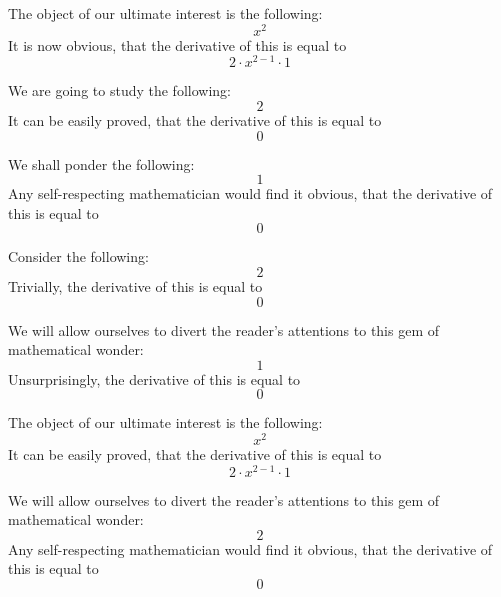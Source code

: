 \documentclass{article}
\begin{document}
The object of our ultimate interest is the following:
\begin{equation}
x ^{2 } 
\end{equation}
It is now obvious, that the derivative of this is equal to
\begin{equation}
2 \cdot x ^{2 - 1 } \cdot 1 
\end{equation}

We are going to study the following:
\begin{equation}
2 
\end{equation}
It can be easily proved, that the derivative of this is equal to
\begin{equation}
0 
\end{equation}

We shall ponder the following:
\begin{equation}
1 
\end{equation}
Any self-respecting mathematician would find it obvious, that the derivative of this is equal to
\begin{equation}
0 
\end{equation}

Consider the following:
\begin{equation}
2 
\end{equation}
Trivially, the derivative of this is equal to
\begin{equation}
0 
\end{equation}

We will allow ourselves to divert the reader's attentions to this gem of mathematical wonder:
\begin{equation}
1 
\end{equation}
Unsurprisingly, the derivative of this is equal to
\begin{equation}
0 
\end{equation}

The object of our ultimate interest is the following:
\begin{equation}
x ^{2 } 
\end{equation}
It can be easily proved, that the derivative of this is equal to
\begin{equation}
2 \cdot x ^{2 - 1 } \cdot 1 
\end{equation}

We will allow ourselves to divert the reader's attentions to this gem of mathematical wonder:
\begin{equation}
2 
\end{equation}
Any self-respecting mathematician would find it obvious, that the derivative of this is equal to
\begin{equation}
0 
\end{equation}
\end{document}
